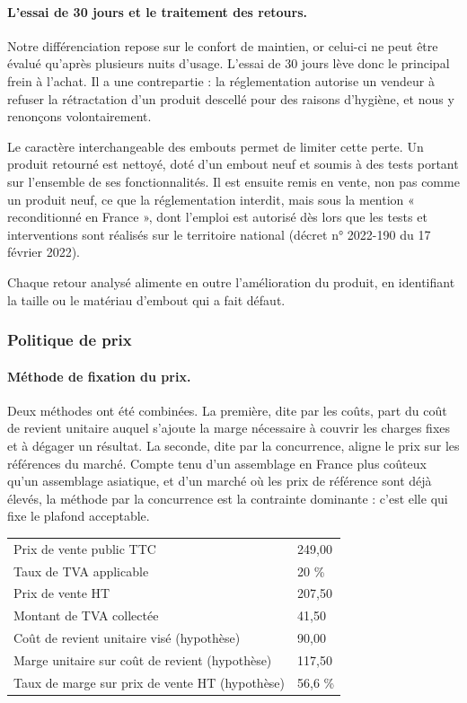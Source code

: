 \paragraph{L'essai de 30 jours et le traitement des retours.}
Notre différenciation repose sur le confort de maintien, or celui-ci ne peut
être évalué qu'après plusieurs nuits d'usage. L'essai de 30 jours lève donc le
principal frein à l'achat. Il a une contrepartie : la réglementation autorise un
vendeur à refuser la rétractation d'un produit descellé pour des raisons
d'hygiène, et nous y renonçons volontairement.

Le caractère interchangeable des embouts permet de limiter cette perte. Un
produit retourné est nettoyé, doté d'un embout neuf et soumis à des tests
portant sur l'ensemble de ses fonctionnalités. Il est ensuite remis en vente,
non pas comme un produit neuf, ce que la réglementation interdit, mais sous la
mention « reconditionné en France », dont l'emploi est autorisé dès lors que les
tests et interventions sont réalisés sur le territoire national (décret
n° 2022-190 du 17 février 2022).

Chaque retour analysé alimente en outre l'amélioration du produit, en
identifiant la taille ou le matériau d'embout qui a fait défaut.

\subsubsection{Politique de prix}

\paragraph{Méthode de fixation du prix.}
Deux méthodes ont été combinées. La première, dite par les coûts, part du coût
de revient unitaire auquel s'ajoute la marge nécessaire à couvrir les charges
fixes et à dégager un résultat. La seconde, dite par la concurrence, aligne le
prix sur les références du marché. Compte tenu d'un assemblage en France plus
coûteux qu'un assemblage asiatique, et d'un marché où les prix de référence sont
déjà élevés, la méthode par la concurrence est la contrainte dominante : c'est
elle qui fixe le plafond acceptable.

\begin{center}
\begin{tabularx}{\textwidth}{LP{3.2cm}}
\toprule
{} &  \\
\midrule
Prix de vente public TTC & 249,00 \texteuro{} \\
Taux de TVA applicable & 20 \% \\
Prix de vente HT & 207,50 \texteuro{} \\
Montant de TVA collectée & 41,50 \texteuro{} \\
Coût de revient unitaire visé (hypothèse) & 90,00 \texteuro{} \\
Marge unitaire sur coût de revient (hypothèse) & 117,50 \texteuro{} \\
Taux de marge sur prix de vente HT (hypothèse) & 56,6 \% \\
\bottomrule
\end{tabularx}
\end{center}

